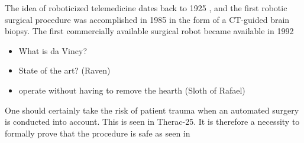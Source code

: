The idea of roboticized telemedicine dates back to 1925 \cite{bib:telemed_predict}, and the first robotic surgical procedure was accomplished in 1985 \cite{bib:telesurg_history} in the form of a CT-guided brain biopsy. The first commercially available surgical robot became available in 1992


\begin{itemize}
\item What is da Vincy?
\item State of the art? (Raven)
\item operate without having to remove the hearth (Sloth of Rafael)
\end{itemize}
One should certainly take the risk of patient trauma when an automated surgery is conducted into account. This is seen in Therac-25. It is therefore a necessity to formally prove that the procedure is safe as seen in \citep{bib:safety}
